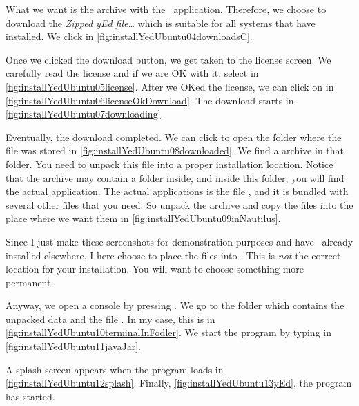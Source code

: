 What we want is the  archive with the \yEd\ application.
Therefore, we choose to download the \emph{Zipped yEd  file\dots} which is suitable for all systems that have  installed.
We click  in \cref{fig:installYedUbuntu04downloadsC}.

Once we clicked the download button, we get taken to the license screen.
We carefully read the license and if we are OK with it, select  in \cref{fig:installYedUbuntu05license}.
After we OKed the license, we can click on  in \cref{fig:installYedUbuntu06licenseOkDownload}.
The download starts in \cref{fig:installYedUbuntu07downloading}.

Eventually, the download completed.
We can click to open the folder where the file was stored in \cref{fig:installYedUbuntu08downloaded}.
We find a  archive in that folder.
You need to unpack this file into a proper installation location.
Notice that the  archive may contain a folder inside, and inside this folder, you will find the actual application.
The actual applications is the file , and it is bundled with several other files that you need.
So unpack the  archive and copy the files into the place where we want them in \cref{fig:installYedUbuntu09inNautilus}.

Since I just make these screenshots for demonstration purposes and have \yEd\ already installed elsewhere, I here choose to place the files into .
This is \emph{not} the correct location for your installation.
You will want to choose something more permanent.

Anyway, we open a console by pressing \ubuntuTerminal.
We go to the folder which contains the unpacked data and the file .
In my case, this is  in \cref{fig:installYedUbuntu10terminalInFodler}.
We start the program by typing  in \cref{fig:installYedUbuntu11javaJar}.

A splash screen appears when the program loads in \cref{fig:installYedUbuntu12splash}.
Finally, \cref{fig:installYedUbuntu13yEd}, the program has started.%
%
\endhsection%
%
